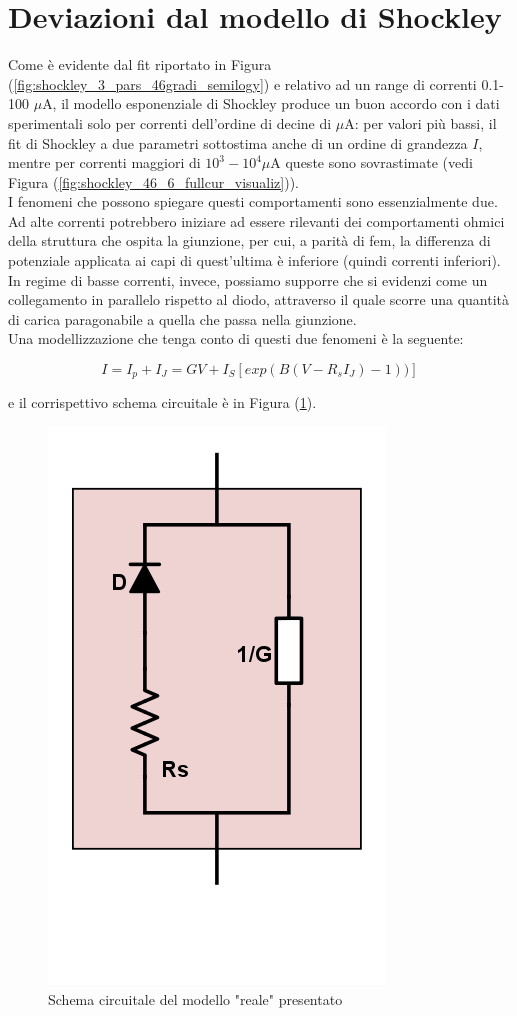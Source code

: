 \documentclass[10pt,letterpaper]{article}
\begin{document}
\section{Deviazioni dal modello di Shockley}

Come è evidente dal fit riportato in Figura (\ref{fig:shockley_3_pars_46gradi_semilogy}) e relativo ad un range di correnti 0.1-100 $\mu$A, il modello esponenziale di Shockley produce un buon accordo con i dati sperimentali solo per correnti dell'ordine di decine di $\mu$A: per valori più bassi, il fit di Shockley a due parametri sottostima anche di un ordine di grandezza $I$, mentre per correnti maggiori di $10^3-10^4 \mu$A queste sono sovrastimate (vedi Figura (\ref{fig:shockley_46_6_fullcur_visualiz})).\\
I fenomeni che possono spiegare questi comportamenti sono essenzialmente due. Ad alte correnti potrebbero iniziare ad essere rilevanti dei comportamenti ohmici della struttura che ospita la giunzione, per cui, a parità di fem, la differenza di potenziale applicata ai capi di quest'ultima è inferiore (quindi correnti inferiori). In regime di basse correnti, invece, possiamo supporre che si evidenzi come un collegamento in parallelo rispetto al diodo, attraverso il quale scorre una quantità di carica paragonabile a quella che passa nella giunzione.\\

Una modellizzazione che tenga conto di questi due fenomeni è la seguente:

\begin{equation}\label{corrente_totale}
I = I_p + I_J = GV + I_S \left[exp(B(V-R_s I_J)-1))\right]
\end{equation}

e il corrispettivo schema circuitale è in Figura (\ref{fig:schema_circuit}).\\

\begin{figure}
\centering
\includegraphics[width=0.3\linewidth]{./schema_circuit}
\caption{Schema circuitale del modello "reale" presentato}
\label{fig:schema_circuit}
\end{figure}
\end{document}
